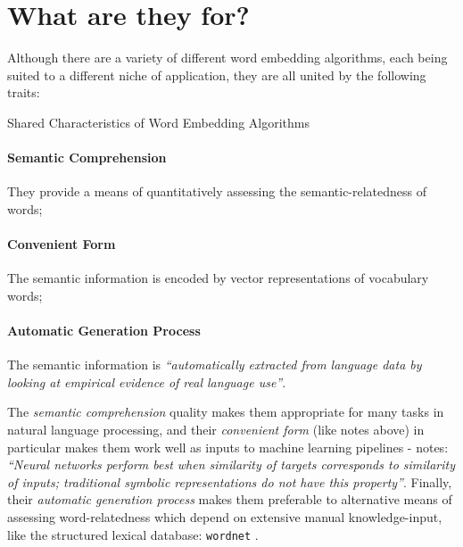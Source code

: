 \documentclass{ucetd}
\begin{document}
\section{What are they for?}
Although there are a variety of different word embedding algorithms, each being suited to a different niche of application, they are all united by the following traits:
\begin{infobox}{Shared Characteristics of Word Embedding Algorithms}
\paragraph{Semantic Comprehension} They provide a means of quantitatively assessing the semantic-relatedness of words;
\paragraph{Convenient Form} The semantic information is encoded by vector representations of vocabulary words;
\paragraph{Automatic Generation Process} The semantic information is \emph{``automatically extracted from language data by looking at empirical evidence of real language use''}.
\end{infobox}
The \emph{semantic comprehension} quality makes them appropriate for many tasks in natural language processing, and their \emph{convenient form} (like \citeauthor{almeida19-word-embed} notes above) in particular makes them work well as inputs to machine learning pipelines -\textcite{shutze-1993-word-space} notes: \emph{``Neural networks perform best when similarity of targets corresponds to similarity of inputs; traditional symbolic representations do not have this property''}. Finally, their \emph{automatic generation process} makes them preferable to alternative means of assessing word-relatedness which depend on extensive manual knowledge-input, like the structured lexical database: \texttt{wordnet} \parencite{miller-1990-intro-to-wordnet}.
\end{document}
